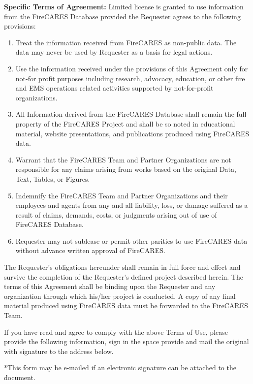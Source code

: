 \documentclass[12pt,oneside]{book}
\begin{document}
{\bf Specific Terms of Agreement:}
Limited license is granted to use information from the FireCARES Database provided the Requester agrees to the following provisions:
\begin{enumerate}
\item Treat the information received from FireCARES as non-public data. The data may never be used by Requester as a basis for legal actions.
\item Use the information received under the provisions of this Agreement only for not-for profit purposes including research, advocacy, education, or other fire and EMS
operations related activities supported by not-for-profit organizations.
\item All Information derived from the FireCARES Database shall remain the full property of the FireCARES Project and shall be so noted in educational material, website
presentations, and publications produced using FireCARES data.
\item Warrant that the FireCARES Team and Partner Organizations are not responsible for any claims arising from works based on the original Data, Text, Tables, or Figures.
\item Indemnify the FireCARES Team and Partner Organizations and their employees and agents from any and all liability, loss, or damage suffered as a result of claims,
demands, costs, or judgments arising out of use of FireCARES Database.
\item Requester may not sublease or permit other parities to use FireCARES data without advance written approval of FireCARES.
\end{enumerate}

The Requester's obligations hereunder shall remain in full force and effect and survive the completion of the Requester's defined project described herein. The terms of this
Agreement shall be binding upon the Requester and any organization through which his/her project is conducted. A copy of any final material produced using FireCARES data must be forwarded to the FireCARES Team. 

\clearpage

If you have read and agree to comply with the above Terms of Use, please provide the following information, sign in the space provide and mail the original with signature to the address below.

*This form may be e-mailed if an electronic signature can be attached to the document. \\
\end{document}
